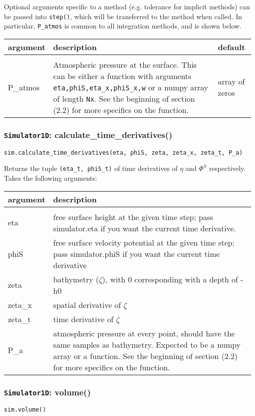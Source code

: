 \documentclass[10pt,a4paper]{article}
\newenvironment{arglist}
    {\begin{center}
    \begin{tabular}{l|p{12cm}}
    argument & description\\
    \hline\\
    }
    { 
    \end{tabular} 
    \end{center}
    }
\newenvironment{optarglist}
    {\begin{center}
    \begin{tabular}{l|p{10cm}|l}
    argument & description & default\\
    \hline\\
    }
    { 
    \end{tabular} 
    \end{center}
    }
\begin{document}
Optional arguments specific to a method (e.g. tolerance for implicit methods) can be passed into \texttt{step()}, which will be transferred to the method when called. In particular, \texttt{P\_atmos} is common to all integration methods, and is shown below.

\begin{optarglist}
P\_atmos & Atmospheric pressure at the surface. This can be either a function with arguments \texttt{eta,phiS,eta\_x,phiS\_x,w} or a numpy array of length \texttt{Nx}. See the beginning of section (2.2) for more specifics on the function. & array of zeros
\end{optarglist}





\subsubsection{\texttt{Simulator1D}: calculate\_time\_derivatives()}
\texttt{sim.calculate\_time\_derivatives(eta, phiS, zeta, zeta\_x, zeta\_t, P\_a)}

Returns the tuple \texttt{(eta\_t, phiS\_t)} of time derivatives of $\eta$ and $\Phi^S$ respectively. Takes the following arguments:

\begin{arglist}
eta      & free surface height at the given time step; pass
                    simulator.eta if you want the current time derivative.\\\hline
        phiS     & free surface velocity potential at the given time step;
                    pass simulator.phiS if you want the current time derivative\\\hline
        zeta     & bathymetry ($\zeta$), with 0 corresponding with a depth of -h0\\\hline
        zeta\_x   & spatial derivative of $\zeta$\\\hline
        zeta\_t   & time derivative of $\zeta$\\\hline
        P\_a      & atmospheric pressure at every point, should have the
                    same samples as bathymetry. Expected to be a numpy
                    array or a function. See the beginning of section (2.2) for more specifics on the function.
\end{arglist}




\subsubsection{\texttt{Simulator1D}: volume()}
\texttt{sim.volume()}
\end{document}
